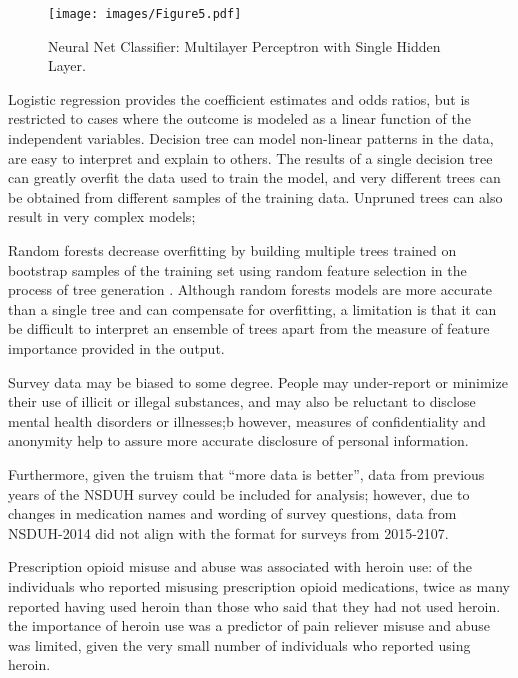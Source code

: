 \begin{figure}[!ht]
  \centering\texttt{[image: images/Figure5.pdf]}
  \caption{Neural Net Classifier: Multilayer Perceptron with Single Hidden Layer.}
  \label{f:Figure5}
\end{figure}


Logistic 
regression provides the coefficient estimates and odds ratios, but is 
restricted to cases where the outcome is modeled as a linear function of 
the independent variables. Decision tree can model non-linear patterns in 
the data, are easy to interpret and explain to others. The results of a 
single decision tree can greatly overfit the data used to train the model, 
and very different trees can be obtained from different samples of the 
training data. Unpruned trees can also result in very complex models; 

Random forests decrease overfitting by building multiple trees trained on
bootstrap samples of the training set using random feature selection in the
process of tree generation \cite{brown12}. Although random forests models are
more accurate than a single tree and can compensate for overfitting, a 
limitation is that it can be difficult to interpret an ensemble of trees apart 
from the measure of feature importance provided in the output. 


Survey data may be biased to some degree. People may under-report or minimize 
their use of illicit or illegal substances, and may also be reluctant to 
disclose mental health disorders or illnesses;b however, measures of 
confidentiality and anonymity help to assure more accurate disclosure 
of personal information. 


 Furthermore, given the truism that ``more data is better'', 
data from previous years of the NSDUH survey could be included for analysis;
however, due to changes in medication names and wording of survey questions, 
data from NSDUH-2014 did not align with the format for surveys from 2015-2107. 


Prescription opioid misuse and abuse was associated with heroin use: of 
the individuals who reported misusing prescription opioid medications, twice 
as many reported having used heroin than those who said that they had not used 
heroin. the importance of heroin use was a predictor of pain reliever misuse and
abuse was limited, given the very small number of individuals who reported 
using heroin.




